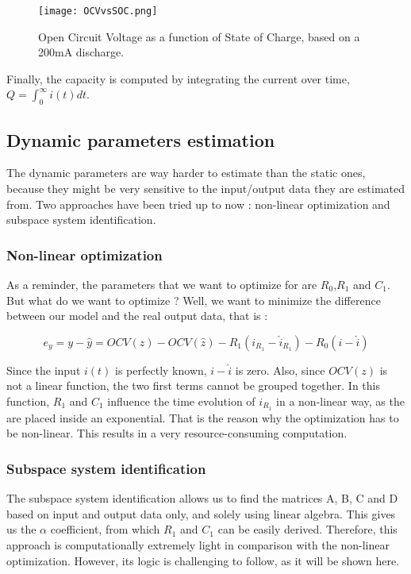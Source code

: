 \documentclass{article}
\begin{document}
\begin{figure}[h]
\centering
\texttt{[image: OCVvsSOC.png]}
\caption{Open Circuit Voltage as a function of State of Charge, based on a 200mA discharge.}
\label{fig:OCVvsSOC}
\end{figure}


Finally, the capacity is computed by integrating the current over time, $Q = \int_0^\infty i(t) dt$.
 
\subsection{Dynamic parameters estimation}

The dynamic parameters are way harder to estimate than the static ones, because they might be very sensitive to the input/output data they are estimated from. Two approaches have been tried up to now : non-linear optimization and subspace system identification. 

\subsubsection{Non-linear optimization}

As a reminder, the parameters that we want to optimize for are $R_0$,$R_1$ and $C_1$. But what do we want to optimize ? Well, we want to minimize the difference between our model and the real output data, that is : 

\begin{equation}
e_y = y - \hat{y} = OCV(z) -OCV(\hat{z}) - R_1( i_{R_1} - \hat{i}_{R_1}) - R_0(i - \hat{i})
\end{equation}

Since the input $i(t)$ is perfectly known, $i-\hat{i}$ is zero. Also, since $OCV(z)$ is not a linear function, the two first terms cannot be grouped together. In this function, $R_1$ and $C_1$ influence the time evolution of $i_{R_1}$ in a non-linear way, as the are placed inside an exponential. That is the reason why the optimization has to be non-linear. This results
in a very resource-consuming computation.

\subsubsection{Subspace system identification}

The subspace system identification allows us to find the matrices A, B, C and D based on input and output data only, and solely using linear algebra. This gives us the $\alpha$ coefficient, from which $R_1$ and $C_1$ can be easily derived. Therefore, this approach is computationally extremely light in comparison with the non-linear optimization. However, its logic is challenging to follow, as it will be shown here.
\end{document}
